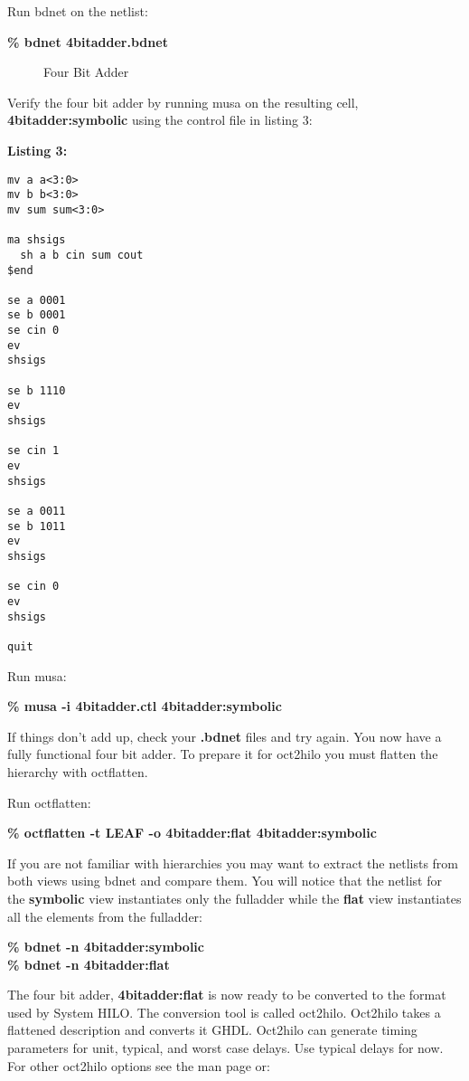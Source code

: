 Run bdnet on the netlist:

{\bf   \% bdnet 4bitadder.bdnet}

\begin{figure}
\centering
\vspace{3.0in}
\caption{Four Bit Adder }
\label{fig:4bitadder}
\end{figure}

  Verify the four bit adder by running musa on the resulting cell, 
{\bf 4bitadder:symbolic} using the control file in listing 3:

{\bf Listing 3:}

\begin{verbatim}
mv a a<3:0>
mv b b<3:0>
mv sum sum<3:0>

ma shsigs
  sh a b cin sum cout
$end

se a 0001
se b 0001
se cin 0
ev
shsigs

se b 1110
ev
shsigs

se cin 1
ev
shsigs

se a 0011
se b 1011
ev
shsigs

se cin 0
ev
shsigs

quit
\end{verbatim}

  Run musa:

{\bf   \% musa -i 4bitadder.ctl 4bitadder:symbolic}

  If things don't add up, check your {\bf .bdnet} files and try again.
You now have a fully functional four bit adder.  To prepare it for 
oct2hilo you must flatten the hierarchy with octflatten.

  Run octflatten:

{\bf   \% octflatten -t LEAF -o 4bitadder:flat 4bitadder:symbolic}

  If you are not familiar with hierarchies you may want to 
extract the netlists from both views using bdnet and compare
them.  You will notice that the netlist for the {\bf symbolic} view
instantiates only the fulladder while the {\bf flat} view instantiates
all the elements from the fulladder:

{\bf   \% bdnet -n 4bitadder:symbolic}\\
{\bf   \% bdnet -n 4bitadder:flat}

  The four bit adder, {\bf 4bitadder:flat}  is now ready to be 
converted to the format used by System HILO.  The conversion tool 
is called oct2hilo.  Oct2hilo takes a flattened description
and converts it GHDL.  Oct2hilo can generate timing parameters
for unit, typical, and worst case delays.  Use typical
delays for now.  For other oct2hilo options see the man page or:

